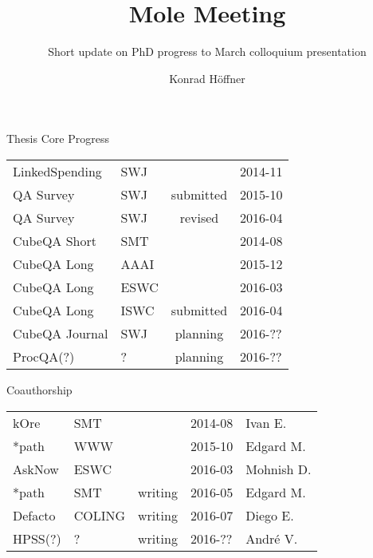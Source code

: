 \documentclass[14pt]{beamer}
\author{Konrad Höffner}
\title{Mole Meeting}
\subtitle{Short update on PhD progress to March colloquium presentation}
\newcommand{\xmark}{\ding{55}}%
\begin{document}
\begin{frame}
\titlepage
\end{frame}


\begin{frame}{Thesis Core Progress}
\begin{tabular}{llcl}
LinkedSpending	&SWJ		&\checkmark				&2014-11\\
QA Survey	&SWJ		&submitted				&2015-10\\
QA Survey	&SWJ		&revised				&2016-04\\
CubeQA Short	&SMT		&\checkmark				&2014-08\\
CubeQA Long	&AAAI		&\xmark					&2015-12\\
CubeQA Long	&ESWC		&\xmark					&2016-03\\
CubeQA Long	&ISWC		&submitted				&2016-04\\
\rule{0pt}{3ex}                                                         
CubeQA Journal	&SWJ		&planning				&2016-??\\
ProcQA(?)	&?		&planning				&2016-??\\
\end{tabular}
\end{frame}

\begin{frame}{Coauthorship}
\begin{tabular}{lllll}
kOre		&SMT		&\checkmark	      	&2014-08	&Ivan E.\\
*path		&WWW		&\xmark			&2015-10      	&Edgard M.\\
AskNow		&ESWC		&\checkmark	      	&2016-03	&Mohnish D.\\
\rule{0pt}{3ex}                                                         
*path		&SMT		&writing	      	&2016-05 	&Edgard M.\\
Defacto		&COLING		&writing	      	&2016-07	&Diego E.\\	
HPSS(?)		&?		&writing		&2016-??	&André V.\\

\end{tabular}
\end{frame}
\end{document}
